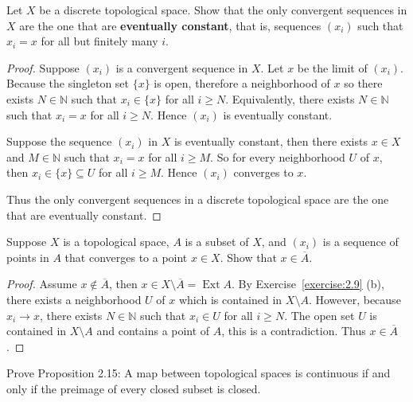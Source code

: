 \begin{exercise}{2.13}
	Let $X$ be a discrete topological space. Show that the only convergent sequences in $X$ are the one that are \textbf{eventually constant}, that is, sequences $(x_{i})$ such that $x_{i} = x$ for all but finitely many $i$.
\end{exercise}

\begin{proof}
	Suppose ${(x_{i})}$ is a convergent sequence in $X$. Let $x$ be the limit of ${(x_{i})}$. Because the singleton set $\{ x \}$ is open, therefore a neighborhood of $x$ so there exists $N\in\mathbb{N}$ such that $x_{i}\in \{ x \}$ for all $i\geq N$. Equivalently, there exists $N\in\mathbb{N}$ such that $x_{i} = x$ for all $i\geq N$. Hence ${(x_{i})}$ is eventually constant.

	Suppose the sequence ${(x_{i})}$ in $X$ is eventually constant, then there exists $x\in X$ and $M\in\mathbb{N}$ such that $x_{i} = x$ for all $i\geq M$. So for every neighborhood $U$ of $x$, then $x_{i}\in \{ x \}\subseteq U$ for all $i\geq M$. Hence ${(x_{i})}$ converges to $x$.

	Thus the only convergent sequences in a discrete topological space are the one that are eventually constant.
\end{proof}

\begin{exercise}{2.14}\label{exercise:2.14}
	Suppose $X$ is a topological space, $A$ is a subset of $X$, and ${(x_{i})}$ is a sequence of points in $A$ that converges to a point $x\in X$. Show that $x\in\overline{A}$.
\end{exercise}

\begin{proof}
	Assume $x\notin \overline{A}$, then $x\in X\setminus\overline{A} = \operatorname{Ext} A$. By Exercise~\ref{exercise:2.9} (b), there exists a neighborhood $U$ of $x$ which is contained in $X\setminus A$. However, because $x_{i}\to x$, there exists $N\in\mathbb{N}$ such that $x_{i}\in U$ for all $i\geq N$. The open set $U$ is contained in $X\setminus A$ and contains a point of $A$, this is a contradiction. Thus $x\in\overline{A}$.
\end{proof}

\begin{exercise}{2.16}
	Prove Proposition 2.15: A map between topological spaces is continuous if and only if the preimage of every closed subset is closed.
\end{exercise}

